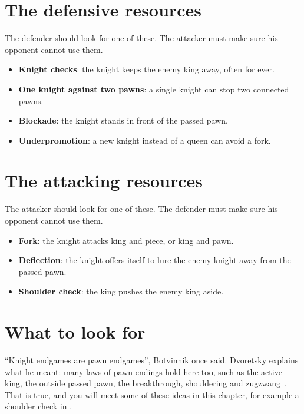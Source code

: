 
\section*{The defensive resources}
The defender should look for one of these. The attacker must make sure his opponent cannot use them.

\begin{itemize}
\item \textbf{Knight checks}: the knight keeps the enemy king away, often for ever.

\item \textbf{One knight against two pawns}: a single knight can stop two connected pawns.

\item \textbf{Blockade}: the knight stands in front of the passed pawn.

\item \textbf{Underpromotion}: a new knight instead of a queen can avoid a fork.
\end{itemize}

\section*{The attacking resources}
The attacker should look for one of these. The defender must make sure his opponent cannot use them.

\begin{itemize}
\item \textbf{Fork}: the knight attacks king and piece, or king and pawn.

\item \textbf{Deflection}: the knight offers itself to lure the enemy knight away from the passed pawn.

\item \textbf{Shoulder check}: the king pushes the enemy king aside.
\end{itemize}

\section*{What to look for}
``Knight endgames are pawn endgames'', Botvinnik once said. Dvoretsky explains what he meant: many
laws of pawn endings hold here too, such as the active king, the outside passed pawn, the
breakthrough, shouldering and zugzwang~\cite{Dvoretsky:2008-endgame-manual}. That is true, and you
will meet some of these ideas in this chapter, for example a shoulder check
in .

